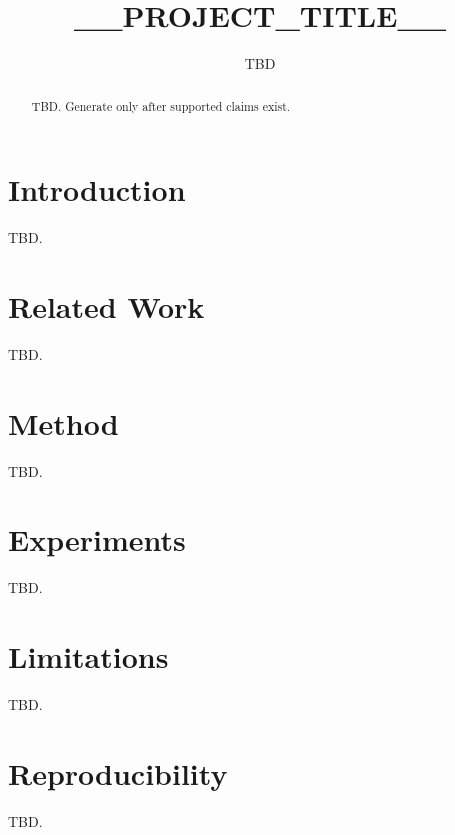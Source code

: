 \documentclass{article}
\begin{document}
\title{__PROJECT_TITLE__}
\author{TBD}
\maketitle

\begin{abstract}
TBD. Generate only after supported claims exist.
\end{abstract}

\section{Introduction}
TBD.

\section{Related Work}
TBD.

\section{Method}
TBD.

\section{Experiments}
TBD.

\section{Limitations}
TBD.

\section{Reproducibility}
TBD.
\end{document}
